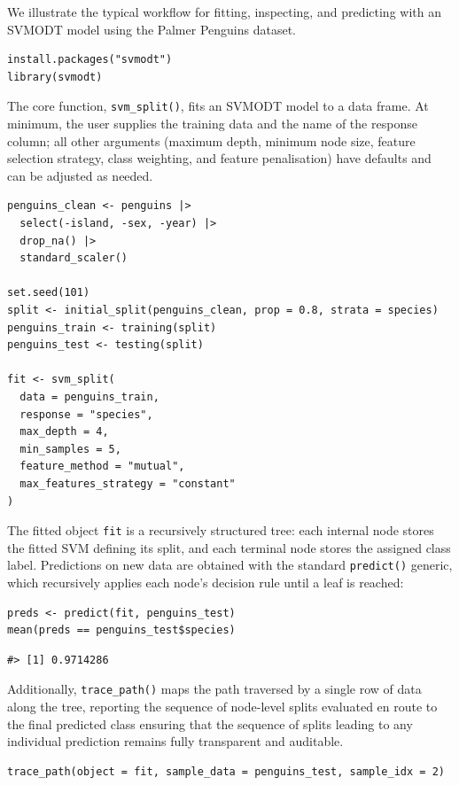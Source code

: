 We illustrate the typical workflow for fitting, inspecting, and predicting with an SVMODT model using the Palmer Penguins dataset.

\begin{verbatim}
install.packages("svmodt")
library(svmodt)
\end{verbatim}

The core function, \texttt{svm\_split()}, fits an SVMODT model to a data frame. At minimum, the user supplies the training data and the name of the response column; all other arguments (maximum depth, minimum node size, feature selection strategy, class weighting, and feature penalisation) have defaults and can be adjusted as needed.

\begin{verbatim}
penguins_clean <- penguins |>
  select(-island, -sex, -year) |>
  drop_na() |>
  standard_scaler()

set.seed(101)
split <- initial_split(penguins_clean, prop = 0.8, strata = species)
penguins_train <- training(split)
penguins_test <- testing(split)

fit <- svm_split(
  data = penguins_train,
  response = "species",
  max_depth = 4,
  min_samples = 5,
  feature_method = "mutual",
  max_features_strategy = "constant"
)
\end{verbatim}

The fitted object \texttt{fit} is a recursively structured tree: each internal node stores the fitted SVM defining its split, and each terminal node stores the assigned class label. Predictions on new data are obtained with the standard \texttt{predict()} generic, which recursively applies each node's decision rule until a leaf is reached:

\begin{verbatim}
preds <- predict(fit, penguins_test)
mean(preds == penguins_test$species)
\end{verbatim}

\begin{verbatim}
#> [1] 0.9714286
\end{verbatim}

Additionally, \texttt{trace\_path()} maps the path traversed by a single row of data along the tree, reporting the sequence of node-level splits evaluated en route to the final predicted class ensuring that the sequence of splits leading to any individual prediction remains fully transparent and auditable.

\begin{verbatim}
trace_path(object = fit, sample_data = penguins_test, sample_idx = 2)
\end{verbatim}

